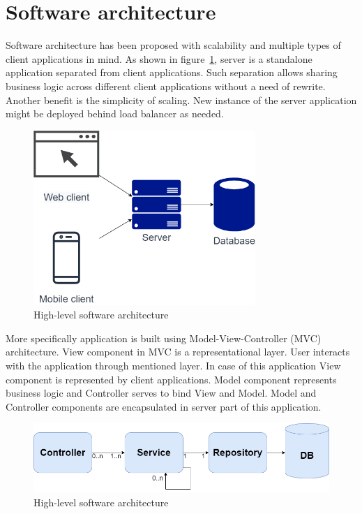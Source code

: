 
\section{Software architecture}\label{sec:software-architecture}

Software architecture has been proposed with scalability and multiple types of client applications in mind.
As shown in figure~\ref{fig:high-level-architecture}, server is a standalone application separated from client applications.
Such separation allows sharing business logic across different client applications without a need of rewrite.
Another benefit is the simplicity of scaling.
New instance of the server application might be deployed behind load balancer as needed.

\begin{figure}[h!]
    \includegraphics[width=0.75\textwidth]{images/high-level-architecture}
    \caption{High-level software architecture}
    \label{fig:high-level-architecture}
\end{figure}

More specifically application is built using Model-View-Controller (MVC) architecture.\cite{wiki-mvc}
View component in MVC is a representational layer.
User interacts with the application through mentioned layer.
In case of this application View component is represented by client applications.
Model component represents business logic and Controller serves to bind View and Model.
Model and Controller components are encapsulated in server part of this application.

\begin{figure}[h!]
    \includegraphics[width=1\textwidth]{images/server-mvc-spring}
    \caption{High-level software architecture}
    \label{fig:server-mvc-spring}
\end{figure}

